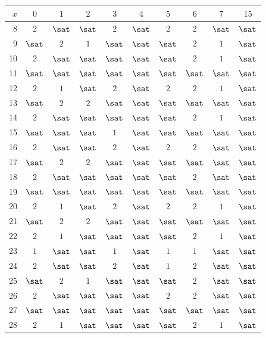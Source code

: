 {\small\renewcommand{\arraystretch}{0.94}
\begin{tabular}{r*{9}{c}}
\toprule
$x$ & $0$ & $1$ & $2$ & $3$ & $4$ & $5$ & $6$ & $7$ & $15$\\
\midrule
8 & $2$ & $\sat$ & $\sat$ & $2$ & $\sat$ & $2$ & $2$ & $\sat$ & $\sat$\\
9 & $\sat$ & $2$ & $1$ & $\sat$ & $\sat$ & $\sat$ & $2$ & $1$ & $\sat$\\
10 & $2$ & $\sat$ & $\sat$ & $\sat$ & $\sat$ & $\sat$ & $2$ & $1$ & $\sat$\\
11 & $\sat$ & $\sat$ & $\sat$ & $\sat$ & $\sat$ & $\sat$ & $\sat$ & $\sat$ & $\sat$\\
12 & $2$ & $1$ & $\sat$ & $2$ & $\sat$ & $2$ & $2$ & $1$ & $\sat$\\
13 & $\sat$ & $2$ & $2$ & $\sat$ & $\sat$ & $\sat$ & $\sat$ & $\sat$ & $\sat$\\
14 & $2$ & $\sat$ & $\sat$ & $\sat$ & $\sat$ & $\sat$ & $2$ & $1$ & $\sat$\\
\midrule
15 & $\sat$ & $\sat$ & $\sat$ & $1$ & $\sat$ & $\sat$ & $\sat$ & $\sat$ & $\sat$\\
16 & $2$ & $\sat$ & $\sat$ & $2$ & $\sat$ & $2$ & $2$ & $\sat$ & $\sat$\\
17 & $\sat$ & $2$ & $2$ & $\sat$ & $\sat$ & $\sat$ & $\sat$ & $\sat$ & $\sat$\\
18 & $2$ & $\sat$ & $\sat$ & $\sat$ & $\sat$ & $\sat$ & $2$ & $\sat$ & $\sat$\\
19 & $\sat$ & $\sat$ & $\sat$ & $\sat$ & $\sat$ & $\sat$ & $\sat$ & $\sat$ & $\sat$\\
20 & $2$ & $1$ & $\sat$ & $2$ & $\sat$ & $2$ & $2$ & $1$ & $\sat$\\
21 & $\sat$ & $2$ & $2$ & $\sat$ & $\sat$ & $\sat$ & $\sat$ & $\sat$ & $\sat$\\
22 & $2$ & $1$ & $\sat$ & $\sat$ & $\sat$ & $\sat$ & $2$ & $1$ & $\sat$\\
23 & $1$ & $\sat$ & $\sat$ & $1$ & $\sat$ & $1$ & $1$ & $\sat$ & $\sat$\\
24 & $2$ & $\sat$ & $\sat$ & $2$ & $\sat$ & $1$ & $2$ & $\sat$ & $\sat$\\
25 & $\sat$ & $2$ & $1$ & $\sat$ & $\sat$ & $\sat$ & $2$ & $\sat$ & $\sat$\\
26 & $2$ & $\sat$ & $\sat$ & $\sat$ & $\sat$ & $2$ & $2$ & $\sat$ & $\sat$\\
27 & $\sat$ & $\sat$ & $\sat$ & $\sat$ & $\sat$ & $\sat$ & $\sat$ & $\sat$ & $\sat$\\
28 & $2$ & $1$ & $\sat$ & $\sat$ & $\sat$ & $\sat$ & $2$ & $1$ & $\sat$\\

\end{tabular}}
